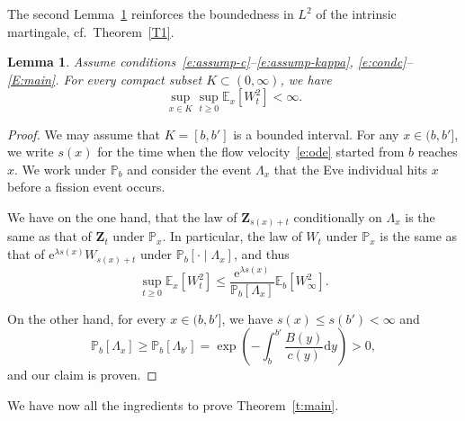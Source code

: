 \documentclass[11pt]{article}
\newtheorem{lemm}[theo]{Lemma}
\theoremstyle{definition}
\providecommand{\mathof}[1]{\mathrm{#1}}
\numberwithin{equation}{section}
\numberwithin{figure}{section}
\numberwithin{table}{section}
\newcommand\Zz{\mathbf{Z}}
\newcommand\PP{\mathbb{P}}
\newcommand\EE{\mathbb{E}}
\newcommand\e{\mathrm{e}}
\newcommand\dd{\mathof{d}}
\begin{document}
The second Lemma~\ref{L:C} reinforces the boundedness in $L^2$ of the intrinsic martingale, cf.~Theorem~\ref{T1}.

\begin{lemm}\label{L:C}
Assume conditions~\eqref{e:assump-c}--\eqref{e:assump-kappa}, \eqref{e:condc}--\eqref{E:main}. For every compact subset $K\subset(0,\infty)$, we have
\[
\sup_{x\in K} \sup_{t\geq 0} \EE_x\left[W^2_t \right] < \infty.
\]
\end{lemm}

\begin{proof}
We may assume that $K=[b,b']$ is a bounded interval. For any $x\in(b,b']$, we write $s(x)$ for the time when the flow velocity~\eqref{e:ode} started from $b$ reaches $x$. We work under
$\PP_{b}$ and consider the event $\Lambda_x$ that the Eve individual hits $x$ before a fission event occurs.

We have on the one hand, that the law of $\Zz_{s(x)+t}$ conditionally on $ \Lambda_x$ is the same as that of $\Zz_t$ under $\PP_x$. In particular, the law of $W_t$ under $\PP_x$ is the same as that of $\e^{\lambda s(x)} W_{s(x)+t}$ under $\PP_b[\cdot \mid \Lambda_x]$, and thus
\[
\sup_{t\geq 0} \EE_x\left[W^2_t \right] \leq \frac{\e^{\lambda s(x)}}{\PP_b[\Lambda_x]} \EE_b\left[W^2_{\infty} \right].
\]

On the other hand, for every $x\in(b,b']$, we have $s(x)\leq s(b')<\infty$ and
\[
\PP_b[\Lambda_x]\geq \PP_b[\Lambda_{b'}]=\exp\left(-\int_{b}^{b'} \frac{{B}(y)}{c(y)}\dd y\right)>0,
\]
and our claim is proven.
\end{proof}

We have now all the ingredients to prove Theorem~\ref{t:main}.
\end{document}
